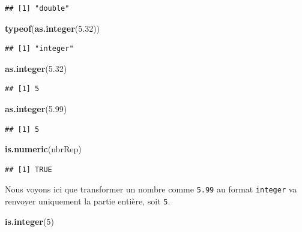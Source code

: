 \documentclass[]{book}
\newenvironment{Shaded}{\begin{snugshade}}{\end{snugshade}}
\newcommand{\DecValTok}[1]{\textcolor[rgb]{0.00,0.00,0.81}{#1}}
\newcommand{\FloatTok}[1]{\textcolor[rgb]{0.00,0.00,0.81}{#1}}
\newcommand{\KeywordTok}[1]{\textcolor[rgb]{0.13,0.29,0.53}{\textbf{#1}}}
\newcommand{\NormalTok}[1]{#1}
\begin{document}
\begin{verbatim}
## [1] "double"
\end{verbatim}

\begin{Shaded}
\begin{Highlighting}[]
\KeywordTok{typeof}\NormalTok{(}\KeywordTok{as.integer}\NormalTok{(}\FloatTok{5.32}\NormalTok{))}
\end{Highlighting}
\end{Shaded}

\begin{verbatim}
## [1] "integer"
\end{verbatim}

\begin{Shaded}
\begin{Highlighting}[]
\KeywordTok{as.integer}\NormalTok{(}\FloatTok{5.32}\NormalTok{)}
\end{Highlighting}
\end{Shaded}

\begin{verbatim}
## [1] 5
\end{verbatim}

\begin{Shaded}
\begin{Highlighting}[]
\KeywordTok{as.integer}\NormalTok{(}\FloatTok{5.99}\NormalTok{)}
\end{Highlighting}
\end{Shaded}

\begin{verbatim}
## [1] 5
\end{verbatim}

\begin{Shaded}
\begin{Highlighting}[]
\KeywordTok{is.numeric}\NormalTok{(nbrRep)}
\end{Highlighting}
\end{Shaded}

\begin{verbatim}
## [1] TRUE
\end{verbatim}

Nous voyons ici que transformer un nombre comme \texttt{5.99} au format \texttt{integer} va renvoyer uniquement la partie entière, soit \texttt{5}.

\begin{Shaded}
\begin{Highlighting}[]
\KeywordTok{is.integer}\NormalTok{(}\DecValTok{5}\NormalTok{)}
\end{Highlighting}
\end{Shaded}
\end{document}
